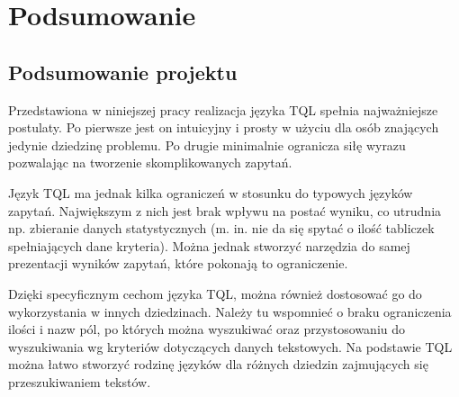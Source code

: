 \chapter*{Podsumowanie}
% 

\section*{Podsumowanie projektu}
Przedstawiona w niniejszej pracy realizacja języka TQL spełnia najważniejsze postulaty. 
Po pierwsze jest on intuicyjny i prosty w użyciu dla osób znających jedynie dziedzinę problemu.
Po drugie minimalnie ogranicza siłę wyrazu pozwalając na tworzenie skomplikowanych zapytań.

Język TQL ma jednak kilka ograniczeń w stosunku do typowych języków zapytań. 
Największym z nich jest brak wpływu na postać wyniku, co utrudnia np. zbieranie danych statystycznych 
(m. in. nie da się spytać o ilość tabliczek spełniających dane kryteria). 
Można jednak stworzyć narzędzia do samej prezentacji wyników zapytań, które pokonają to ograniczenie. 


Dzięki specyficznym cechom języka TQL, można również dostosować go do wykorzystania w innych dziedzinach. 
Należy tu wspomnieć o braku ograniczenia ilości i nazw pól, po których można wyszukiwać oraz przystosowaniu 
do wyszukiwania wg kryteriów dotyczących danych tekstowych. 
Na podstawie TQL można łatwo stworzyć rodzinę języków dla różnych dziedzin zajmujących się przeszukiwaniem tekstów.

